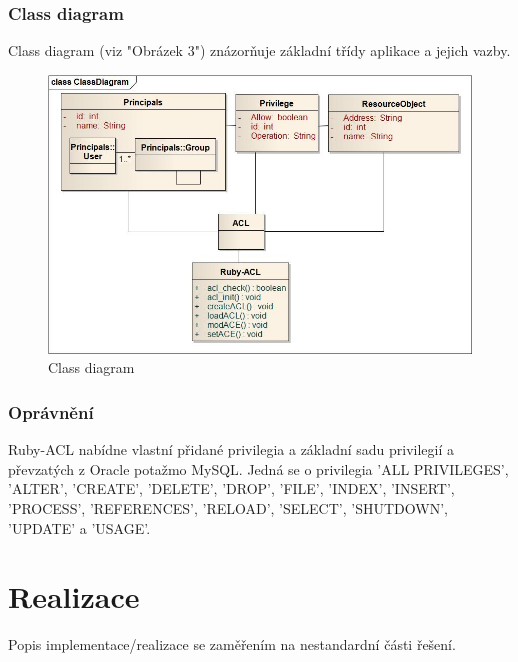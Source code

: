 \documentclass[11pt,twoside,a4paper]{book}
\begin{document}
\subsection{Class diagram}
Class diagram (viz "Obrázek 3") znázorňuje základní třídy aplikace a jejich vazby.
\begin{figure}
\includegraphics[width=15cm]{ClassDiagram2.jpg}
\caption{Class diagram}
\label{fig:Class diagram}
\end{figure}


\newpage
\subsection{Oprávnění}
Ruby-ACL nabídne vlastní přidané privilegia a základní sadu privilegií a převzatých z Oracle potažmo MySQL. Jedná se o privilegia 'ALL PRIVILEGES', 'ALTER', 'CREATE', 'DELETE', 'DROP', 'FILE', 'INDEX', 'INSERT', 'PROCESS', 'REFERENCES', 'RELOAD', 'SELECT', 'SHUTDOWN', 'UPDATE' a 'USAGE'.

\chapter{Realizace}
Popis implementace/realizace se zaměřením na nestandardní části řešení.
\end{document}
